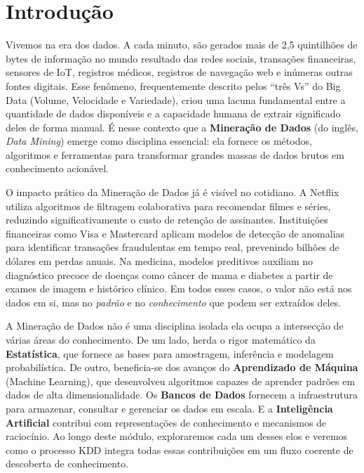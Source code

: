 \documentclass[12pt,a4paper]{article}
\begin{document}
\section{Introdução}

Vivemos na era dos dados. A cada minuto, são gerados mais de 2,5 quintilhões de bytes de informação no mundo resultado das redes sociais, transações financeiras, sensores de IoT, registros médicos, registros de navegação web e inúmeras outras fontes digitais. Esse fenômeno, frequentemente descrito pelos ``três Vs'' do Big Data (Volume, Velocidade e Variedade), criou uma lacuna fundamental entre a quantidade de dados disponíveis e a capacidade humana de extrair significado deles de forma manual. É nesse contexto que a \textbf{Mineração de Dados} (do inglês, \textit{Data Mining}) emerge como disciplina essencial: ela fornece os métodos, algoritmos e ferramentas para transformar grandes massas de dados brutos em conhecimento acionável.

O impacto prático da Mineração de Dados já é visível no cotidiano. A Netflix utiliza algoritmos de filtragem colaborativa para recomendar filmes e séries, reduzindo significativamente o custo de retenção de assinantes. Instituições financeiras como Visa e Mastercard aplicam modelos de detecção de anomalias para identificar transações fraudulentas em tempo real, prevenindo bilhões de dólares em perdas anuais. Na medicina, modelos preditivos auxiliam no diagnóstico precoce de doenças como câncer de mama e diabetes a partir de exames de imagem e histórico clínico. Em todos esses casos, o valor não está nos dados em si, mas no \textit{padrão} e no \textit{conhecimento} que podem ser extraídos deles.

A Mineração de Dados não é uma disciplina isolada ela ocupa a intersecção de várias áreas do conhecimento. De um lado, herda o rigor matemático da \textbf{Estatística}, que fornece as bases para amostragem, inferência e modelagem probabilística. De outro, beneficia-se dos avanços do \textbf{Aprendizado de Máquina} (Machine Learning), que desenvolveu algoritmos capazes de aprender padrões em dados de alta dimensionalidade. Os \textbf{Bancos de Dados} fornecem a infraestrutura para armazenar, consultar e gerenciar os dados em escala. E a \textbf{Inteligência Artificial} contribui com representações de conhecimento e mecanismos de raciocínio. Ao longo deste módulo, exploraremos cada um desses elos e veremos como o processo KDD integra todas essas contribuições em um fluxo coerente de descoberta de conhecimento.
\end{document}
